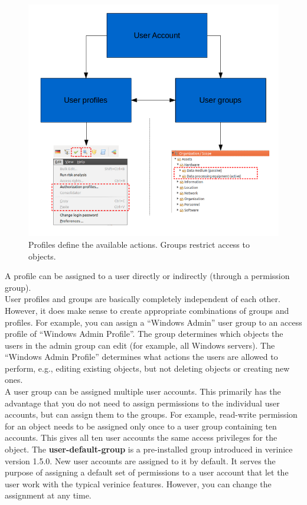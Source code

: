\documentclass[a4paper,10pt]{book}
\begin{document}
\begin{figure}[htb!]
  \centering
  \includegraphics[scale=.4]{Screenshot/Profile-en.png}
  \caption{\label{Profiles define the available actions. Groups restrict access to objects.} Profiles define the available actions. Groups restrict access to objects.}
\end{figure}
A profile can be assigned to a user directly or indirectly (through a permission group).
\newline\\
User profiles and groups are basically completely independent of each other. However, it does make sense to create
appropriate combinations of groups and profiles. For example, you can assign a ``Windows Admin'' user group to an
access profile of ``Windows Admin Profile''. The group determines which objects the users in the admin group can
edit (for example, all Windows servers). The ``Windows Admin Profile'' determines what actions the users are allowed
to perform, e.g., editing existing objects, but not deleting objects or creating new ones.
\newline\\
A user group can be assigned multiple user accounts. This primarily has the advantage that you do not need to assign
permissions to the individual user accounts, but can assign them to the groups. For example, read-write permission
for an object needs to be assigned only once to a user group containing ten accounts. This gives all ten user
accounts the same access privileges for the object.
The \textbf{user-default-group} is a pre-installed group introduced in verinice version 1.5.0. New user
accounts are assigned to it by default. It serves the purpose of assigning a default set of permissions to a
user account that let the user work with the typical verinice features. However, you can change the assignment
at any time.
\end{document}
